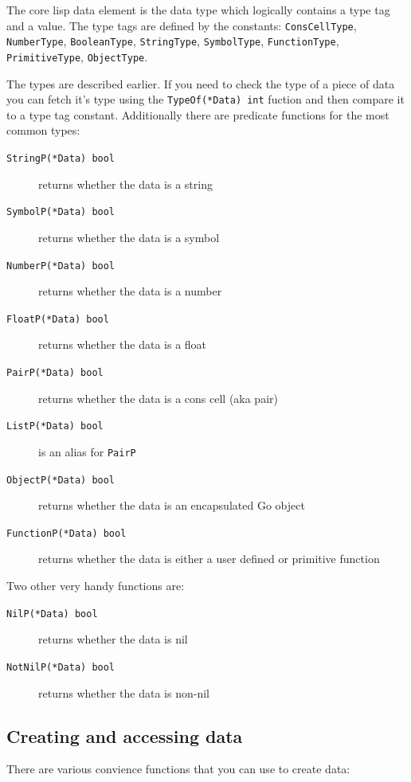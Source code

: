 \documentclass[12pt]{article}
\begin{document}
The core lisp data element is the data type which logically
contains a type tag and a value. The type tags are defined by the
constants: \verb|ConsCellType|, \verb|NumberType|, \verb|BooleanType|,
\verb|StringType|, \verb|SymbolType|, \verb|FunctionType|,
\verb|PrimitiveType|, \verb|ObjectType|.

\noindent The types are described earlier. If you need to check the
type of a piece of data you can fetch it's type using the
\verb|TypeOf(*Data) int| fuction and then compare it to a type tag
constant. Additionally there are predicate functions for the most
common types:

\begin{description}
\item [{\tt StringP(*Data) bool}] returns whether the data is a string
\item [{\tt SymbolP(*Data) bool}] returns whether the data is a symbol
\item [{\tt NumberP(*Data) bool}] returns whether the data is a number
\item [{\tt FloatP(*Data) bool}] returns whether the data is a float
\item [{\tt PairP(*Data) bool}] returns whether the data is a cons cell
  (aka pair)
\item [{\tt ListP(*Data) bool}] is an alias for \verb|PairP|
\item [{\tt ObjectP(*Data) bool}] returns whether the data is an
  encapsulated Go object
\item [{\tt FunctionP(*Data) bool}] returns whether the data is either
  a user defined or primitive function
\end{description}

\noindent Two other very handy functions are:

\begin{description}
\item [{\tt NilP(*Data) bool}] returns whether the data is nil
\item [{\tt NotNilP(*Data) bool}] returns whether the data is non-nil
\end{description}

\subsection{Creating and accessing data}

There are various convience functions that you can use to create data:
\end{document}
